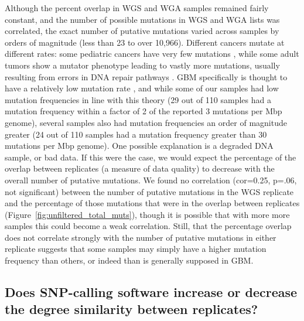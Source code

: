 \documentclass[11pt]{article} %
\begin{document}
Although the percent overlap in WGS and WGA samples remained fairly constant, and the number of possible mutations in WGS and WGA lists was correlated, the exact number of putative mutations varied across samples by orders of magnitude (less than 23 to over 10,966). Different cancers mutate at different rates: some pediatric cancers have very few mutations \citep{RB2hit, pediatric}, while some adult tumors show a mutator phenotype leading to vastly more mutations, usually resulting from errors in DNA repair pathways \citep{mutator}. GBM specifically is thought to have a relatively low mutation rate \citep{Parsons, TCGA-GBM-13}, and while some of our samples had low mutation frequencies in line with this theory (29 out of 110 samples had a mutation frequency within a factor of 2 of the reported 3 mutations per Mbp genome), several samples also had mutation frequencies an order of magnitude greater (24 out of 110 samples had a mutation frequency greater than 30 mutations per Mbp genome). One possible explanation is a degraded DNA sample, or bad data. If this were the case, we would expect the percentage of the overlap between replicates (a measure of data quality) to decrease with the overall number of putative mutations. We found no correlation (cor=0.25, p=.06, not significant) between the number of putative mutations in the WGS replicate and the percentage of those mutations that were in the overlap between replicates (Figure~\ref{fig:unfiltered_total_muts}), though it is possible that with more more samples this could become a weak correlation. Still, that the percentage overlap does not correlate strongly with the number of putative mutations in either replicate suggests that some samples may simply have a higher mutation frequency than others, or indeed than is generally supposed in GBM.

\subsection*{Does SNP-calling software increase or decrease the degree similarity between replicates?}
\end{document}
